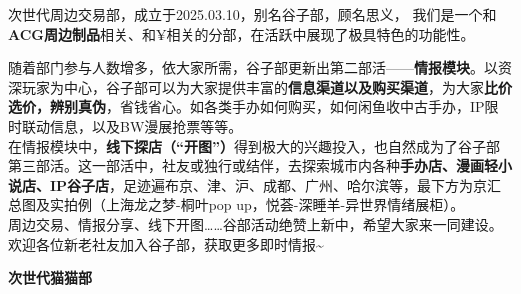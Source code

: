 \normalsize
\par
\vspace{0.5em}
\chind 次世代周边交易部，成立于2025.03.10，别名谷子部，顾名思义，
我们是一个和\textbf{ACG周边制品}相关、和¥相关的分部，在活跃中展现了极具特色的功能性。
\hfill
{}
\par
\vspace{0.5em}
\chind 随着部门参与人数增多，依大家所需，谷子部更新出第二部活——\textbf{情报模块}。以资深玩家为中心，谷子部可以为大家提供丰富的\textbf{信息渠道以及购买渠道}，为大家\textbf{比价选价，辨别真伪}，省钱省心。如各类手办如何购买，如何闲鱼收中古手办，IP限时联动信息，以及BW漫展抢票等等。\\
\chind 在情报模块中，\textbf{线下探店（“开图”）}得到极大的兴趣投入，也自然成为了谷子部第三部活。这一部活中，社友或独行或结伴，去探索城市内各种\textbf{手办店、漫画轻小说店、IP谷子店}，足迹遍布京、津、沪、成都、广州、哈尔滨等，最下方为京汇总图及实拍例（上海龙之梦-桐叶pop up，悦荟-深睡羊-异世界情绪展柜）。\\
\chind 周边交易、情报分享、线下开图……谷部活动绝赞上新中，希望大家来一同建设。欢迎各位新老社友加入谷子部，获取更多即时情报\~{}
\par
{}
\hfill
{}
\newpage
\fontsize{23pt}{24pt}\selectfont
\textbf{\textcolor{truepurple}{次世代猫猫部}}\\
\vspace{0.7em}



